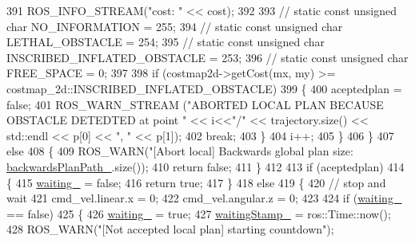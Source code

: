 \begin{DoxyCode}
{{391             ROS\_INFO\_STREAM(\textcolor{stringliteral}{"cost: "} << cost);
392 
393             \textcolor{comment}{// static const unsigned char NO\_INFORMATION = 255;}
394             \textcolor{comment}{// static const unsigned char LETHAL\_OBSTACLE = 254;}
395             \textcolor{comment}{// static const unsigned char INSCRIBED\_INFLATED\_OBSTACLE = 253;}
396             \textcolor{comment}{// static const unsigned char FREE\_SPACE = 0;}
397 
398             \textcolor{keywordflow}{if} (costmap2d->getCost(mx, my) >= costmap\_2d::INSCRIBED\_INFLATED\_OBSTACLE)
399             \{
400                 aceptedplan = \textcolor{keyword}{false};
401                 ROS\_WARN\_STREAM (\textcolor{stringliteral}{"ABORTED LOCAL PLAN BECAUSE OBSTACLE DETEDTED at point "} << i<<\textcolor{stringliteral}{"/"} << 
      trajectory.size() << std::endl << p[0] << \textcolor{stringliteral}{", "} << p[1]);
402                 \textcolor{keywordflow}{break};
403             \}
404             i++;
405         \}
406     \}
407     \textcolor{keywordflow}{else}
408     \{
409         ROS\_WARN(\textcolor{stringliteral}{"[Abort local] Backwards global plan size: %
      \hyperlink{classmove__base__z__client_1_1backward__local__planner_1_1BackwardLocalPlanner_a451add2af7d6d83a7415277311b3ed04}{backwardsPlanPath\_}.size());
410         \textcolor{keywordflow}{return} \textcolor{keyword}{false};
411     \}
412 
413     \textcolor{keywordflow}{if} (aceptedplan)
414     \{
415         \hyperlink{classmove__base__z__client_1_1backward__local__planner_1_1BackwardLocalPlanner_a6969156ab6f82e03418987af4c5bd589}{waiting\_} = \textcolor{keyword}{false};
416         \textcolor{keywordflow}{return} \textcolor{keyword}{true};
417     \}
418     \textcolor{keywordflow}{else}
419     \{
420         \textcolor{comment}{// stop and wait}
421         cmd\_vel.linear.x = 0;
422         cmd\_vel.angular.z = 0;
423 
424         \textcolor{keywordflow}{if} (\hyperlink{classmove__base__z__client_1_1backward__local__planner_1_1BackwardLocalPlanner_a6969156ab6f82e03418987af4c5bd589}{waiting\_} == \textcolor{keyword}{false})
425         \{
426             \hyperlink{classmove__base__z__client_1_1backward__local__planner_1_1BackwardLocalPlanner_a6969156ab6f82e03418987af4c5bd589}{waiting\_} = \textcolor{keyword}{true};
427             \hyperlink{classmove__base__z__client_1_1backward__local__planner_1_1BackwardLocalPlanner_aea0e5312bd482daafc0b8779efaf56a0}{waitingStamp\_} = ros::Time::now();
428             ROS\_WARN(\textcolor{stringliteral}{"[Not accepted local plan] starting countdown"});
}}}
\end{DoxyCode}
